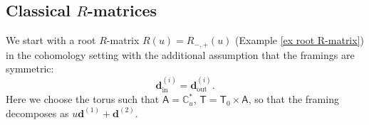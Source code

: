 \documentclass[10pt]{amsart}
\theoremstyle{definition}
\numberwithin{equation}{section}
\newcommand{\bC}{\mathbb{C}}
\newcommand{\bv}{\mathbf{v}}
\newcommand{\bd}{\mathbf{d}}
\newcommand{\fM}{\mathfrak{M}}
\newcommand{\sA}{\mathsf{A}}
\newcommand{\sT}{\mathsf{T}}
\newcommand{\End}{\operatorname{End}}
\newcommand{\Hom}{\operatorname{Hom}}
\newcommand{\Pic}{\operatorname{Pic}}
\newcommand{\In}{\operatorname{in}}
\newcommand{\Out}{\operatorname{out}}
\begin{document}



\subsection{Classical \texorpdfstring{$R$}{R}-matrices}
We start with a root $R$-matrix $R(u)=R_{-,+}(u)$ (Example \ref{ex root R-matrix}) in the cohomology setting with the additional assumption that the framings are symmetric: 
$$\bd^{(i)}_{\In}=\bd^{(i)}_{\Out}. $$ 
Here we choose the torus such that $\sA=\bC^*_u$, $\sT=\sT_0\times \sA$, so that the framing decomposes as $u\bd^{(1)}+\bd^{(2)}$. 
\end{document}
